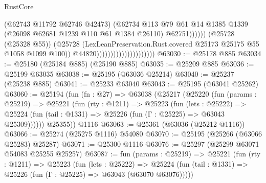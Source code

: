 \begin{lexlean}{RustCore}
\begin{coremodule}
                                                        (@62743 @11792 @62746 @42473)
                                                        (@62734
                                                          @113
                                                          @79
                                                          @61
                                                          @14
                                                          @1385
                                                          @1339
                                                          (@26098
                                                            @62681
                                                            @1239
                                                            @110
                                                            @61
                                                            @1384
                                                            @26110)
                                                          @62751))))))
                                              (@25728 (@25328 @55))
                                              (@25728
                                                (LexLeanPreservation.Rust.covered
                                                  @25173
                                                  @25175
                                                  @55
                                                  @1058
                                                  @1099
                                                  @100))
                                              @44820)))))))))))))))))))))
@63030 := @25178 @885
@63034 := @25180 (@25184 @885) (@25190 @885)
@63035 := @25209 @885
@63036 := @25199 @63035
@63038 := @25195 (@63036 @25214)
@63040 := @25237 (@25238 @885)
@63041 := @25233 @63040
@63043 := @25195 (@63041 @25262)
@63060 := @25194
    (fun (fn : @27) =>
    @63038
      (@25217
        (@25220
          (fun (params : @25219) =>
          @25221
            (fun (rty : @1211) =>
            @25223
              (fun (lets : @25222) =>
              @25224 (fun (tail : @1331) => @25226 (fun (Γ : @25225) => @63043 @25309))))))
        @25355))
    @1116
@63063 := @25361 (@63036 (@25212 @1116))
@63066 := @25274 (@25275 @1116) @54080
@63070 := @25195 (@25266 (@63066 @25283) @25287)
@63071 := @25300 @1116
@63076 := @25297 (@25299 @63071 @54083 @25255 @25257)
@63087 := fun (params : @25219) =>
  @25221
    (fun (rty : @1211) =>
    @25223
      (fun (lets : @25222) =>
      @25224 (fun (tail : @1331) => @25226 (fun (Γ : @25225) => @63043 (@63070 @63076)))))

\end{coremodule}
\end{lexlean}
